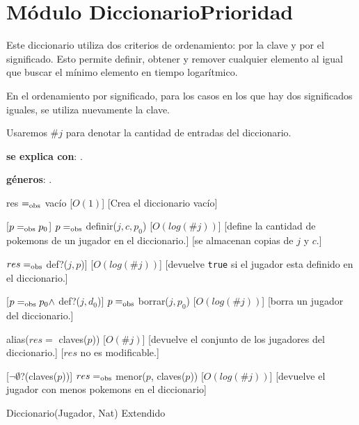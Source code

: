 \section{Módulo DiccionarioPrioridad}

Este diccionario utiliza dos criterios de ordenamiento: por la clave y por el significado. Esto permite definir, obtener y remover cualquier elemento al igual que buscar el mínimo elemento en tiempo logarítmico.

En el ordenamiento por significado, para los casos en los que hay dos significados iguales, se utiliza nuevamente la clave.

Usaremos $\#j$ para denotar la cantidad de entradas del diccionario.

\begin{Interfaz}
	\textbf{se explica con}: . 

	\textbf{géneros}: .


	{res $=_{\mathrm{obs}}$ vacío}
	[$O(1)$]
	[Crea el diccionario vacío]

	[$p =_{\mathrm{obs}} p_0$]
	{$p =_{\mathrm{obs}}$ definir($j, c, p_0$)}
	[$O(log(\#j))$]
	[define la cantidad de pokemons de un jugador en el diccionario.]
	[se almacenan copias de $j$ y $c$.]

	{$res =_{\mathrm{obs}}$ def?($j, p$)]}
	[$O(log(\#j))$]
	[devuelve \texttt{true} si el jugador esta definido en el diccionario.]

	[$p =_{\mathrm{obs}} p_0 \land$ def?($j, d_0$)]
	{$p =_{\mathrm{obs}}$ borrar($j, p_0$)}
	[$O(log(\#j))$]
	[borra un jugador del diccionario.]

	{alias($res =$ claves($p$))}
	[$O(\#j)$]
	[devuelve el conjunto de los jugadores del diccionario.]
	[$res$ no es modificable.]

	[$\neg\emptyset$?(claves($p$))]
	{$res =_{\mathrm{obs}}$ menor($p$, claves($p$))}
	[$O(log(\#j))$]
	[devuelve el jugador con menos pokemons en el diccionario]


  \begin{tad}{Diccionario(Jugador, Nat) Extendido}
    \parskip=0pt
    
    \tadAxiomas
  \end{tad}

\end{Interfaz}


